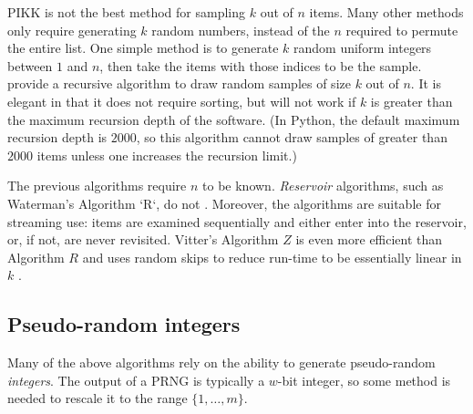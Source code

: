 \documentclass[graybox]{svmult}
\newcommand*\Let[2]{\State #1 $\gets$ #2}
\begin{document}
PIKK is not the best method for sampling $k$ out of $n$ items.
Many other methods only require generating $k$ random numbers, instead of the $n$ required to permute the entire list.
One simple method is to generate $k$ random uniform integers between $1$ and $n$, then take the items with those indices to be the sample.
\cite{cormen_introduction_2009} provide a recursive algorithm to draw random samples of size $k$ out of $n$.
It is elegant in that it does not require sorting, but will not work if $k$ is greater than the maximum recursion depth of the software.
(In Python, the default maximum recursion depth is $2000$, so this algorithm cannot draw samples of greater than $2000$ items unless one increases the recursion limit.)
%
%
%
%
%

The previous algorithms require $n$ to be known.
\emph{Reservoir} algorithms, such as Waterman's Algorithm `R`, do not  \cite{knuth_art_1997}.
Moreover, the algorithms are suitable for streaming use: items are examined
sequentially and either enter into the reservoir, or, if not, are never revisited.
Vitter's Algorithm $Z$ is even more efficient than Algorithm $R$ and uses random skips to reduce run-time to be essentially linear in $k$ \cite{vitter_random_1985}.


\subsection{Pseudo-random integers}
\label{sec:integers}
Many of the above algorithms rely on the ability to generate pseudo-random \emph{integers}.
The output of a PRNG is typically a $w$-bit integer, so some method is needed to rescale it to the range $\{1, \ldots, m\}$.
\end{document}
